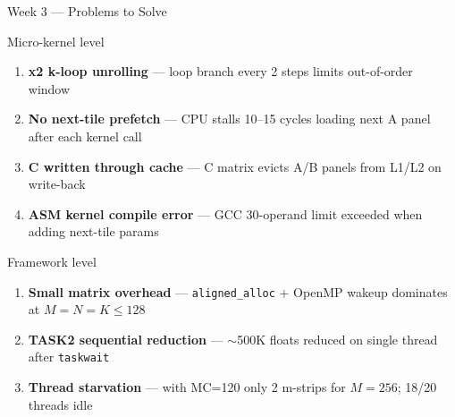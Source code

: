 \documentclass[aspectratio=169]{beamer}
\begin{document}
\begin{frame}{Week 3 --- Problems to Solve}
  \begin{block}{Micro-kernel level}
    \begin{enumerate}
      \item[\textbf{P1}] \textbf{x2 k-loop unrolling} --- loop branch every 2 steps limits out-of-order window
      \item[\textbf{P2}] \textbf{No next-tile prefetch} --- CPU stalls 10--15 cycles loading next A panel after each kernel call
      \item[\textbf{P3}] \textbf{C written through cache} --- C matrix evicts A/B panels from L1/L2 on write-back
      \item[\textbf{P4}] \textbf{ASM kernel compile error} --- GCC 30-operand limit exceeded when adding next-tile params
    \end{enumerate}
  \end{block}
  \vspace{0.2cm}
  \begin{block}{Framework level}
    \begin{enumerate}
      \item[\textbf{P5}] \textbf{Small matrix overhead} --- \texttt{aligned\_alloc} + OpenMP wakeup dominates at $M{=}N{=}K{\le}128$
      \item[\textbf{P6}] \textbf{TASK2 sequential reduction} --- $\sim$500K floats reduced on single thread after \texttt{taskwait}
      \item[\textbf{P7}] \textbf{Thread starvation} --- with MC=120 only 2 m-strips for $M{=}256$; 18/20 threads idle
    \end{enumerate}
  \end{block}
\end{frame}
\end{document}
